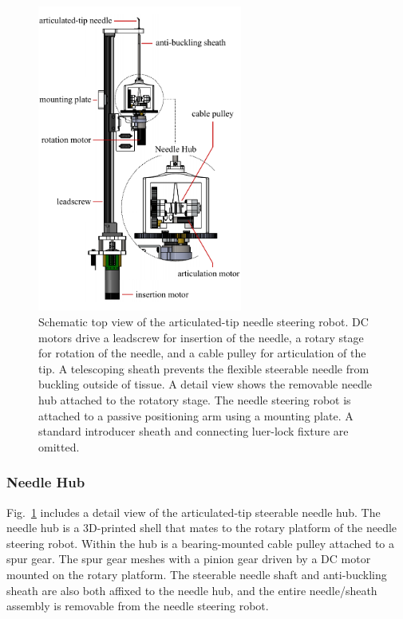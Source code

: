 \begin{figure}[!h]
\centering
\includegraphics[width=0.6\textwidth]{Images/Chapter3/NS2Robot/NS2Robot}
\caption[Top view of the articulated-tip robot]{Schematic top view of the articulated-tip needle steering robot. DC motors drive a leadscrew for insertion of the needle, a rotary stage for rotation of the needle, and a cable pulley for articulation of the tip. A telescoping sheath prevents the flexible steerable needle from buckling outside of tissue. A detail view shows the removable needle hub attached to the rotatory stage. The needle steering robot is attached to a passive positioning arm using a mounting plate. A standard introducer sheath and connecting luer-lock fixture are omitted.}
\label{fig:NS2Robot}
\end{figure}

\subsubsection{Needle Hub}
Fig.~\ref{fig:NS2Robot} includes a detail view of the articulated-tip steerable needle hub. The needle hub is a 3D-printed shell that mates to the rotary platform of the needle steering robot. Within the hub is a bearing-mounted cable pulley attached to a spur gear. The spur gear meshes with a pinion gear driven by a DC motor mounted on the rotary platform. The steerable needle shaft and anti-buckling sheath are also both affixed to the needle hub, and the entire needle/sheath assembly is removable from the needle steering robot.


